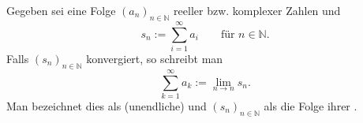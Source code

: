 Gegeben sei eine Folge $(a_n)_{n \in \mathbb{N}}$ reeller bzw. komplexer Zahlen und
$$s_n := \sum_{i=1}^\infty a_i \qquad \text{für $n \in \mathbb{N}$.}$$
Falls $(s_n)_{n \in \mathbb{N}}$ konvergiert, so schreibt man
$$\sum_{k=1}^\infty a_k := \lim_{n \to n} s_n.$$
Man bezeichnet dies als (unendliche)  und $(s_n)_{n \in \mathbb{N}}$ als die Folge ihrer .